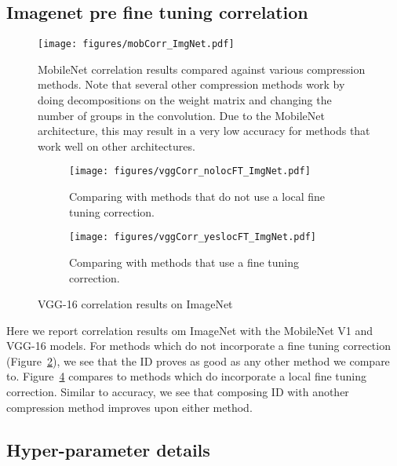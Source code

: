 \subsection{Imagenet pre fine tuning correlation}
\label{app:sec:imgnet_preft_corr}

\begin{figure}
    \centering
    \texttt{[image: figures/mobCorr\_ImgNet.pdf]}
    \caption{MobileNet correlation results compared against various compression methods. Note that several other compression methods work by doing decompositions on the weight matrix and changing the number of groups in the convolution.  Due to the MobileNet architecture, this may result in a very low accuracy for methods that work well on other architectures.}
    \label{fig:movCorr_ImgNet}
\end{figure}

\begin{figure}
\centering
\begin{subfigure}{.47\textwidth}
\centering
\texttt{[image: figures/vggCorr\_nolocFT\_ImgNet.pdf]}
\caption{
Comparing with methods that do not use a local fine tuning correction.
}
\label{fig:vggCorrImgNet_nolocFT}
\end{subfigure}
\begin{subfigure}{0.47\textwidth}
\centering
\texttt{[image: figures/vggCorr\_yeslocFT\_ImgNet.pdf]}
\caption{
Comparing with methods that use a fine tuning correction.
}
\label{fig:vggCorrImgNet_yeslocFT}
\end{subfigure}
\centering
\caption{VGG-16 correlation results on ImageNet}
\end{figure}

Here we report correlation results om ImageNet with the MobileNet V1 and VGG-16 models.
For methods which do not incorporate a fine tuning correction (Figure~\ref{fig:vggCorrImgNet_nolocFT}), we see that the ID proves as good as any other method we compare to.
Figure~\ref{fig:vggCorrImgNet_yeslocFT} compares to methods which do incorporate a local fine tuning correction. 
Similar to accuracy, we see that composing ID with another compression method improves upon either method.





\subsection{Hyper-parameter details}
